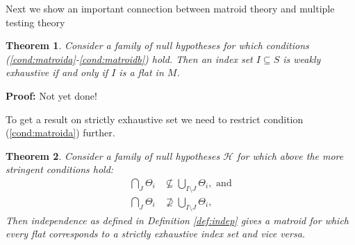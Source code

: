 \documentclass[a4paper,12pt]{article}
\newtheorem{theorem}{Theorem}
\newtheorem{comment}{Comment}
\newenvironment{proof}[1][Proof]{\noindent\textbf{#1:} }{}
\begin{document}
\begin{comment}
    testing perspective we may simple drop $H_1$ as it is simply $H_2
    \cap H_3$ which would be tested anyways.
  \item Now consider for $\delta > 0$,
    \begin{align*}
      H_1:& (\mu_1 \leq 0) &, (\mu_2 \leq 0) \\
      H_2:& \mu_1 &\leq \delta \\
      H_3:& \mu_2 &\leq \delta.
    \end{align*}
    Again, Condition \ref{cond:matroida} does not hold. However, in
    this case replacing the system by an equivalent system of null
    hypotheses is not as straight forward. A solution may be to
    replace $H_1$ by:
    \begin{align*}
      H_{1a}:& \mu_1 &\leq 0 \\
      H_{1b}:& \mu_2 &\leq 0,
    \end{align*}
  \end{itemize}
\end{comment}

Next we show an important connection between matroid theory and
multiple testing theory

\begin{theorem}
  Consider a family of null hypotheses for which conditions
  (\ref{cond:matroida}-\ref{cond:matroidb}) hold. Then an index set $I \subseteq S$ is
  weakly exhaustive if and only if $I$ is a flat in $M$.
\end{theorem}

\begin{proof}
  Not yet done!
\end{proof}

To get a result on strictly exhaustive set we need to restrict
condition (\ref{cond:matroida}) further.

\begin{theorem}
  Consider a family of null hypotheses $\mathcal{H}$ for which above
  the more stringent conditions hold:
  \begin{align}
    \label{cond:matroid2}
    \bigcap_J \Theta_i &\nsubseteq \bigcup_{I\setminus J} \Theta_i,
    \text{ and} \\
    \bigcap_{J}\Theta_i &\nsupseteq     \bigcup_{I \setminus J} \Theta_i ,
  \end{align}
  Then independence as defined in Definition \ref{def:indep} gives a
  matroid for   which every flat corresponds to a strictly exhaustive
  index set and vice versa.
\end{theorem}
\end{document}
